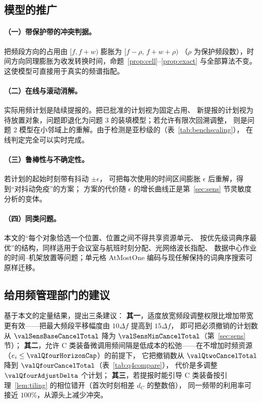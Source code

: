 \subsection{模型的推广}

\paragraph{（一）带保护带的冲突判据。}把频段方向的占用由 $[f,f+w)$ 膨胀为 $[f-\rho,\,f+w+\rho)$
（$\rho$ 为保护频段数），时间方向同理膨胀为收发转换时间，命题~\ref{prop:cell}--\ref{prop:exact} 与全部算法不变。
这使模型可直接用于真实的频谱指配。

\paragraph{（二）在线与滚动消解。}实际用频计划是陆续提报的。把已批准的计划视为固定占用、
新提报的计划视为待放置对象，问题即退化为问题 3 的装填模型；若允许有限次回溯调整，
则是问题 2 模型在小邻域上的重解。由于检测是亚秒级的（表~\ref{tab:benchscaling}），
在线判定完全可以实时完成。

\paragraph{（三）鲁棒性与不确定性。}若计划的起始时刻带有抖动 $\pm\epsilon$，
可把每次使用的时间区间膨胀 $\epsilon$ 后重解，得到“对抖动免疫”的方案；
方案的代价随 $\epsilon$ 的增长曲线正是第~\ref{sec:sens} 节灵敏度分析的变体。

\paragraph{（四）同类问题。}本文的“每个对象恰选一个位置、位置之间不得共享资源单元、
按优先级词典序最优”的结构，同样适用于会议室与航班时刻分配、光网络波长指配、
数据中心作业的时间--机架放置等问题；单元格 AtMostOne 编码与现任解保持的词典序搜索可原样迁移。

\subsection{给用频管理部门的建议}

基于本文的定量结果，提出三条建议：
\textbf{其一}，适度放宽频段调整权限比增加带宽更有效——把最大频段平移幅度由 $10\Delta f$ 提高到 $15\Delta f$，
即可把必须撤销的计划数从 $\valSensBaseCancelTotal$ 降为 $\valSensMinCancelTotal$（第~\ref{sec:sens} 节）；
\textbf{其二}，允许 C 类装备微调用频间隔是低成本的松弛——在不增加时频资源（$e_i\le\valQfourHorizonCap$）的前提下，
它把撤销数从 $\valQtwoCancelTotal$ 降到 $\valQfourCancelTotal$（表~\ref{tab:q4compare}），
代价是多调整 $\valQfourAdjustDelta$ 个计划；
\textbf{其三}，若提报时能引导 C 类装备按引理~\ref{lem:tiling} 的相位错开（首次时刻相差 $d_C$ 的整数倍），
同一频带的利用率可接近 $100\%$，从源头上减少冲突。
